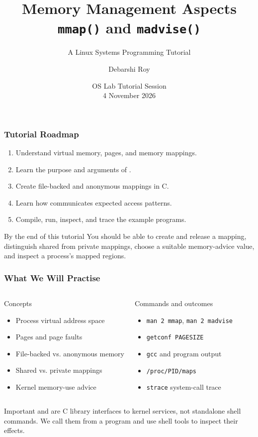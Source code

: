 \documentclass[10pt,hyperref={bookmarks=false},aspectratio=169,usenames,dvipsnames,hideothersubsections]{beamer}
\title[OS Lab: mmap \& madvise]{\bfseries Memory Management Aspects\\\texttt{mmap()} and \texttt{madvise()}}
\subtitle{A Linux Systems Programming Tutorial}
\author[Debarshi Roy]{Debarshi Roy\inst{1}}
\institute[IIIT-Delhi]{Operating Systems Laboratory\\Indraprastha Institute of Information Technology Delhi}
\date[OS Lab Tutorial, 4 Nov 2026]{OS Lab Tutorial Session\\4 November 2026}
\newcommand{\cmd}[1]{\texttt{#1}}
\newcommand{\code}[1]{\texttt{\detokenize{#1}}}
\begin{document}
\frame{\titlepage}

\begin{frame}
\frametitle{Tutorial Roadmap}
\small
\begin{enumerate}
  \item Understand virtual memory, pages, and memory mappings.
  \item Learn the purpose and arguments of \code{mmap()}.
  \item Create file-backed and anonymous mappings in C.
  \item Learn how \code{madvise()} communicates expected access patterns.
  \item Compile, run, inspect, and trace the example programs.
\end{enumerate}
\vspace{0.3em}
\begin{block}{By the end of this tutorial}
You should be able to create and release a mapping, distinguish shared from private mappings, choose a suitable memory-advice value, and inspect a process's mapped regions.
\end{block}
\end{frame}

\begin{frame}
\frametitle{What We Will Practise}
\begin{columns}[T,onlytextwidth]
  \begin{block}{Concepts}
    \begin{itemize}
      \item Process virtual address space
      \item Pages and page faults
      \item File-backed vs. anonymous memory
      \item Shared vs. private mappings
      \item Kernel memory-use advice
    \end{itemize}
  \end{block}
  \begin{block}{Commands and outcomes}
    \begin{itemize}
      \item \cmd{man 2 mmap}, \cmd{man 2 madvise}
      \item \cmd{getconf PAGESIZE}
      \item \cmd{gcc} and program output
      \item \cmd{/proc/PID/maps}
      \item \cmd{strace} system-call trace
    \end{itemize}
  \end{block}
\end{columns}
\begin{alertblock}{Important}
\code{mmap()} and \code{madvise()} are C library interfaces to kernel services, not standalone shell commands. We call them from a program and use shell tools to inspect their effects.
\end{alertblock}
\end{frame}
\end{document}

